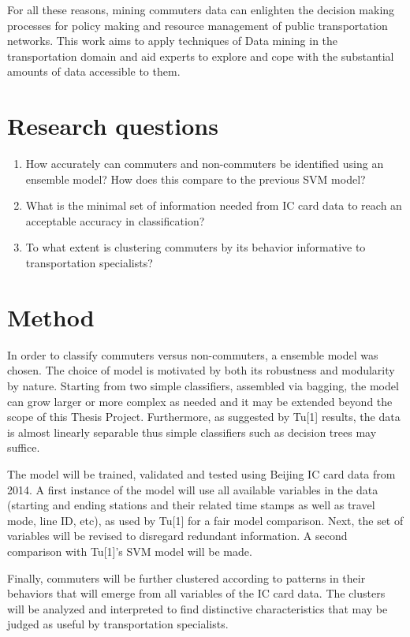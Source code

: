 \documentclass{article}
\begin{document}
For all these reasons, mining commuters data can enlighten the decision making processes for policy making and resource management of public transportation networks. This work aims to apply techniques of Data mining in the transportation domain and aid experts to explore and cope with the substantial amounts of data accessible to them. 

\section{Research questions}

\begin{enumerate}
\item How accurately can commuters and non-commuters be identified using an ensemble model? How does this compare to the previous SVM model?
\item What is the minimal set of information needed from IC card data to reach an acceptable accuracy in classification?
\item To what extent is clustering commuters by its behavior informative to transportation specialists? 
\end{enumerate}

\section{Method}
In order to classify commuters versus non-commuters, a ensemble model was chosen. The choice of model is motivated by both its robustness and modularity by nature. Starting from two simple classifiers, assembled via bagging, the model can grow larger or more complex as needed and it may be extended beyond the scope of this Thesis Project. Furthermore, as suggested by Tu[1] results, the data is almost linearly separable thus simple classifiers such as decision trees may suffice. 

The model will be trained, validated and tested using Beijing IC card data from 2014. A first instance of the model will use all available variables in the data (starting and ending stations and their related time stamps as well as travel mode, line ID, etc), as used by Tu[1] for a fair model comparison. Next, the set of variables will be revised to disregard redundant information. A second comparison with Tu[1]'s SVM model will be made. 

Finally, commuters will be further clustered according to patterns in their behaviors that will emerge from all variables of the IC card data. The clusters will be analyzed and interpreted to find distinctive characteristics that may be judged as useful by transportation specialists. 
\end{document}
